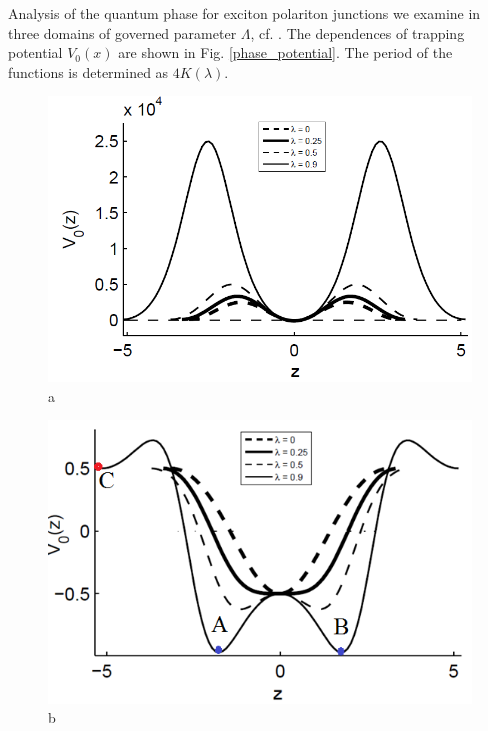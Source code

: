\documentclass[aps, pre, preprint, groupedaddress, superscriptaddress, showkeys, showpacs] {revtex4-1}
\begin{document}
Analysis of the quantum phase for exciton polariton junctions we examine in three domains of  governed parameter $\Lambda$, cf. \cite{40}.
The dependences of trapping potential $V_0(x)$ are shown in Fig. \ref{phase_potential}.
The period of the functions is determined as $4K(\lambda)$.
%
\begin{figure}[ht]
\begin{minipage}[htbp]{0.32\linewidth}	{\includegraphics[width=1\linewidth]{pic/potential_L=100.png} \\ a}
\end{minipage}
\begin{minipage}[htbp]{0.32\linewidth}	{\includegraphics[width=1\linewidth]{pic/potential_L=05.png} \\ b}
\end{minipage}

\end{figure}
\end{document}
